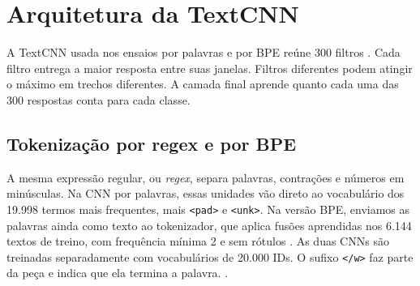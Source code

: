 \section{Arquitetura da TextCNN}
\label{sec:arquitetura}
A TextCNN usada nos ensaios por palavras e por BPE reúne 300 filtros
\cite{kim}. Cada filtro entrega a maior resposta entre suas janelas.
Filtros diferentes podem atingir o máximo em trechos diferentes. A camada
final aprende quanto cada uma das 300 respostas conta para cada classe.

\subsection{Tokenização por regex e por BPE}
A mesma expressão regular, ou \textit{regex}, separa palavras, contrações
e números em minúsculas. Na CNN por palavras, essas unidades vão direto
ao vocabulário dos 19.998 termos mais frequentes, mais \texttt{<pad>} e
\texttt{<unk>}. Na versão BPE, enviamos as palavras ainda como texto ao
tokenizador, que aplica fusões aprendidas nos 6.144 textos de treino, com
frequência mínima 2 e sem rótulos \cite{sennrich}. As duas CNNs são treinadas
separadamente com vocabulários de 20.000 IDs. O sufixo \texttt{</w>} faz parte
da peça e indica que ela termina a palavra.
.




